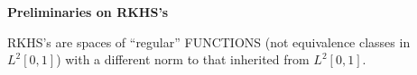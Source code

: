 %
%
%
%
%
% 

\begin{center}
\large \bf  Preliminaries on RKHS's\rm
\end{center}

RKHS's are spaces of ``regular'' FUNCTIONS (not equivalence classes in $L^2[0,1]$) with a different norm to that inherited from $L^2[0,1]$.

